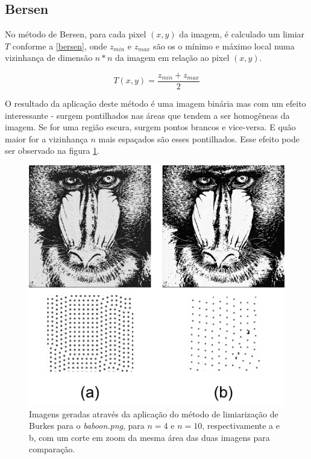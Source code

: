 \documentclass[conference]{IEEEtran}
\begin{document}
\subsection{Bersen}

    No método de Bersen, para cada pixel $(x,y)$ da imagem, é calculado um limiar $T$ conforme a \ref{bersen}, onde $z_{min}$ e $z_{max}$ são os o mínimo e máximo local numa vizinhança de dimensão $n*n$ da imagem em relação ao pixel $(x,y)$.

    \begin{equation}
      T(x,y) = \dfrac{z_{min} + z_{max}}{2}
    \label{bersen}
    \end{equation}

    O resultado da aplicação deste método é uma imagem binária mas com um efeito interessante - surgem pontilhados nas áreas que tendem a ser homogêneas da imagem. Se for uma região escura, surgem pontos brancos e vice-versa.
    E quão maior for a vizinhança $n$ mais espaçados são esses pontilhados.
    Esse efeito pode ser observado na figura \ref{fig:bersen}.

    \begin{figure}[ht]
        \centering
        \includegraphics[width=\linewidth]{bersen.png}
        \caption{Imagens geradas através da aplicação do método de limiarização de Burkes para o \textit{baboon.png}, para $n = 4$ e $n = 10$, respectivamente a e b, com um corte em zoom da mesma área das duas imagens para comparação.}
        \label{fig:bersen}
    \end{figure}
\end{document}

